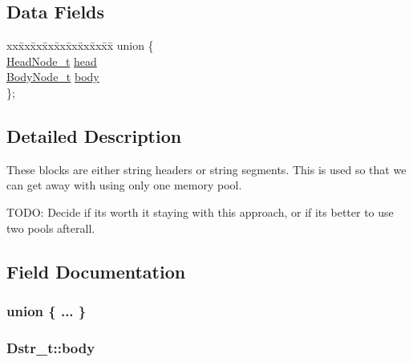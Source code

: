 \subsection*{Data Fields}
\begin{DoxyCompactItemize}
\item 
\begin{tabbing}
xx\=xx\=xx\=xx\=xx\=xx\=xx\=xx\=xx\=\kill
union \{\\
\>\hyperlink{struct_head_node__t}{HeadNode\_t} \hyperlink{struct_dstr__t_a9c34dd3e9c4477f2a6292d4f15d3df86}{head}\\
\>\hyperlink{struct_body_node__t}{BodyNode\_t} \hyperlink{struct_dstr__t_aa1340212130f27f80a25da5a7e585335}{body}\\
\}; \\

\end{tabbing}\end{DoxyCompactItemize}


\subsection{Detailed Description}
These blocks are either string headers or string segments. This is used so that we can get away with using only one memory pool.

T\+O\+DO\+: Decide if it\textquotesingle{}s worth it staying with this approach, or if it\textquotesingle{}s better to use two pools afterall. 

\subsection{Field Documentation}
\subsubsection[{\texorpdfstring{"@1}{@1}}]{\setlength{\rightskip}{0pt plus 5cm}union \{ ... \} }\hypertarget{struct_dstr__t_a988a44d39b0ae212b4591efb753072c8}{}\label{struct_dstr__t_a988a44d39b0ae212b4591efb753072c8}
\subsubsection[{\texorpdfstring{body}{body}}]{ Dstr\+\_\+t\+::body}\hypertarget{struct_dstr__t_aa1340212130f27f80a25da5a7e585335}{}\label{struct_dstr__t_aa1340212130f27f80a25da5a7e585335}

